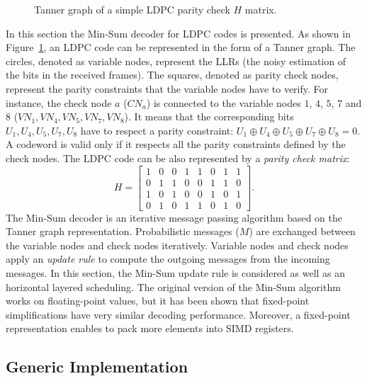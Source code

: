 \begin{figure}[htp]
  \caption{Tanner graph of a simple LDPC parity check $H$ matrix.}
  \label{fig:ldpc}
\end{figure}

In this section the Min-Sum decoder for LDPC codes is presented. As shown in
Figure~\ref{fig:ldpc}, an LDPC code can be represented in the form of a Tanner
graph. The circles, denoted as variable nodes, represent the LLRs (the noisy
estimation of the bits in the received frames). The squares, denoted as parity
check nodes, represent the parity constraints that the variable nodes have to
verify. For instance, the check node $a$ ($CN_a$) is connected to the variable
nodes $1$, $4$, $5$, $7$ and $8$ ($VN_1, VN_4, VN_5, VN_7, VN_8$). It means that
the corresponding bits $U_1, U_4, U_5, U_7, U_8$ have to respect a parity
constraint: $U_1 \oplus U_4 \oplus U_5 \oplus U_7 \oplus U_8 = 0$. A codeword is
valid only if it respects all the parity constraints defined by the check nodes.
The LDPC code can be also represented by a \textit{parity check matrix}:
{ \begin{equation*}
H =
\begin{bmatrix}
  1&0&0&1&1&0&1&1\\
  0&1&1&0&0&1&1&0\\
  1&0&1&0&0&1&0&1\\
  0&1&0&1&1&0&1&0
\end{bmatrix}.
\end{equation*}
}
The Min-Sum decoder is an iterative message passing algorithm based on the
Tanner graph representation. Probabilistic messages ($M$) are exchanged between
the variable nodes and check nodes iteratively. Variable nodes and check nodes
apply an \textit{update rule} to compute the outgoing messages from the incoming
messages. In this section, the Min-Sum update rule is considered as well as an
horizontal layered scheduling. The original version of the Min-Sum algorithm
works on floating-point values, but it has been shown that fixed-point
simplifications have very similar decoding performance. Moreover, a fixed-point
representation enables to pack more elements into SIMD registers.

\subsection{Generic Implementation}

